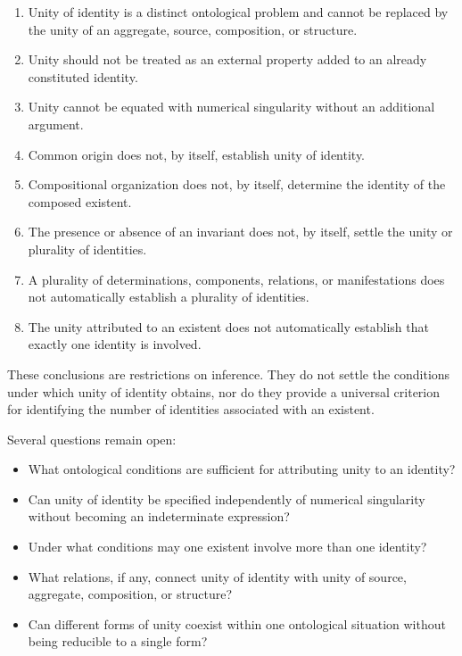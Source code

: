 \begin{enumerate}
    \item Unity of identity is a distinct ontological
    problem and cannot be replaced by the unity
    of an aggregate, source, composition, or structure.

    \item Unity should not be treated as an external
    property added to an already constituted identity.

    \item Unity cannot be equated with numerical
    singularity without an additional argument.

    \item Common origin does not, by itself, establish
    unity of identity.

    \item Compositional organization does not,
    by itself, determine the identity of the
    composed existent.

    \item The presence or absence of an invariant
    does not, by itself, settle the unity or
    plurality of identities.

    \item A plurality of determinations, components,
    relations, or manifestations does not
    automatically establish a plurality of identities.

    \item The unity attributed to an existent does
    not automatically establish that exactly
    one identity is involved.
\end{enumerate}

These conclusions are restrictions on inference.
They do not settle the conditions under which
unity of identity obtains, nor do they provide
a universal criterion for identifying the number
of identities associated with an existent.

Several questions remain open:

\begin{itemize}
    \item What ontological conditions are sufficient
    for attributing unity to an identity?

    \item Can unity of identity be specified
    independently of numerical singularity
    without becoming an indeterminate expression?

    \item Under what conditions may one existent
    involve more than one identity?

    \item What relations, if any, connect unity
    of identity with unity of source, aggregate,
    composition, or structure?

    \item Can different forms of unity coexist
    within one ontological situation without
    being reducible to a single form?
\end{itemize}

